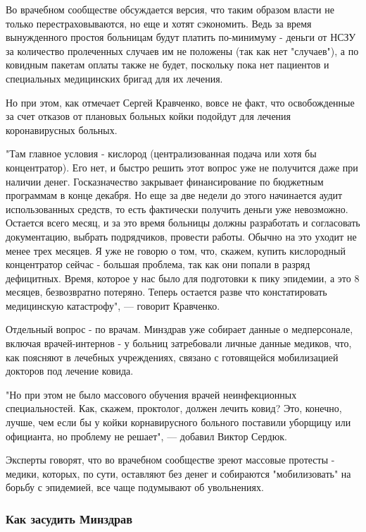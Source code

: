Во врачебном сообществе обсуждается версия, что таким образом власти не только
перестраховываются, но еще и хотят сэкономить. Ведь за время вынужденного
простоя больницам будут платить по-минимуму - деньги от НСЗУ за количество
пролеченных случаев им не положены (так как нет "случаев"), а по ковидным
пакетам оплаты также не будет, поскольку пока нет пациентов и специальных
медицинских бригад для их лечения.

Но при этом, как отмечает Сергей Кравченко, вовсе не факт, что освобожденные за
счет отказов от плановых больных койки подойдут для лечения коронавирусных
больных.

"Там главное условия - кислород (централизованная подача или хотя бы
концентратор). Его нет, и быстро решить этот вопрос уже не получится даже при
наличии денег. Госказначество закрывает финансирование по бюджетным программам
в конце декабря. Но еще за две недели до этого начинается аудит использованных
средств, то есть фактически получить деньги уже невозможно. Остается всего
месяц, и за это время больницы должны разработать и согласовать документацию,
выбрать подрядчиков, провести работы. Обычно на это уходит не менее трех
месяцев. Я уже не говорю о том, что, скажем, купить кислородный концентратор
сейчас - большая проблема, так как они попали в разряд дефицитных. Время,
которое у нас было для подготовки к пику эпидемии, а это 8 месяцев,
безвозвратно потеряно. Теперь остается разве что констатировать медицинскую
катастрофу", — говорит Кравченко.

Отдельный вопрос - по врачам. Минздрав уже собирает данные о медперсонале,
включая врачей-интернов - у больниц затребовали личные данные медиков, что, как
поясняют в лечебных учреждениях, связано с готовящейся мобилизацией докторов
под лечение ковида. 

"Но при этом не было массового обучения врачей неинфекционных специальностей.
Как, скажем, проктолог, должен лечить ковид? Это, конечно, лучше, чем если бы у
койки корнавирусного больного поставили уборщицу или официанта, но проблему не
решает", — добавил Виктор Сердюк.

Эксперты говорят, что во врачебном сообществе зреют массовые протесты - медики,
которых, по сути, оставляют без денег и собираются "мобилизовать" на борьбу с
эпидемией, все чаще подумывают об увольнениях.

\subsubsection{Как засудить Минздрав}


